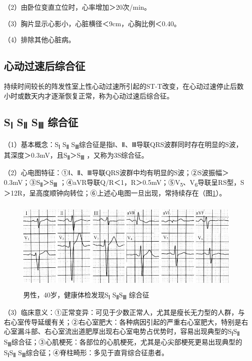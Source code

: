 （2）由卧位变直立位时，心率增加＞20次/min。

（3）胸片显示心影小，心脏横径＜9cm，心胸比例＜0.40。

（4）排除其他心脏病。

\protect\hypertarget{text00047.htmlux5cux23subid566}{}{}

\subsection{心动过速后综合征}

持续时间较长的阵发性室上性心动过速所引起的ST-T改变，在心动过速停止后数小时或数天内才逐渐恢复正常，称为心动过速后综合征。

\protect\hypertarget{text00047.htmlux5cux23subid567}{}{}

\subsection{S\textsubscript{Ⅰ} S\textsubscript{Ⅱ} S\textsubscript{Ⅲ} 综合征}

（1）基本概念：S\textsubscript{Ⅰ} S\textsubscript{Ⅱ} S\textsubscript{Ⅲ}综合征是指Ⅰ、Ⅱ、Ⅲ导联QRS波群同时存在明显的S波，其深度＞0.3mV，且S\textsubscript{Ⅱ}＞S\textsubscript{Ⅲ} ，又称为3S综合征。

（2）心电图特征：①Ⅰ、Ⅱ、Ⅲ导联QRS波群中均有明显的S波；②S波振幅＞0.3mV；③S\textsubscript{Ⅱ}＞S\textsubscript{Ⅲ} ；④aVR导联Q/R＜1，R＞0.5mV；⑤V\textsubscript{5}、V\textsubscript{6}导联呈RS型，S＞12R，呈高度顺钟向转位；⑥上述心电图一旦出现，常持续存在（图\ref{fig40-14}）。

\begin{figure}[!htbp]
 \centering
 \includegraphics[width=5.04167in,height=1.79167in]{./images/Image00676.jpg}
 \captionsetup{justification=centering}
 \caption{男性，40岁，健康体检发现S\textsubscript{Ⅰ} S\textsubscript{Ⅱ}S\textsubscript{Ⅲ} 综合征}
 \label{fig40-14}
  \end{figure} 


（3）临床意义：①正常变异：可见于少数正常人，尤其是瘦长无力型的人群，与右心室传导延缓有关；②右心室肥大：各种病因引起的严重右心室肥大，特别是右心室漏斗部、右心室流出道肥厚出现右心室电势占优势时，容易出现典型的S\textsubscript{Ⅰ}S\textsubscript{Ⅱ} S\textsubscript{Ⅲ}综合征；③心肌梗死：各部位的心肌梗死，尤其是心尖部梗死更易出现典型的S\textsubscript{Ⅰ}S\textsubscript{Ⅱ} S\textsubscript{Ⅲ}综合征；④脊柱畸形：多见于直背综合征患者。

